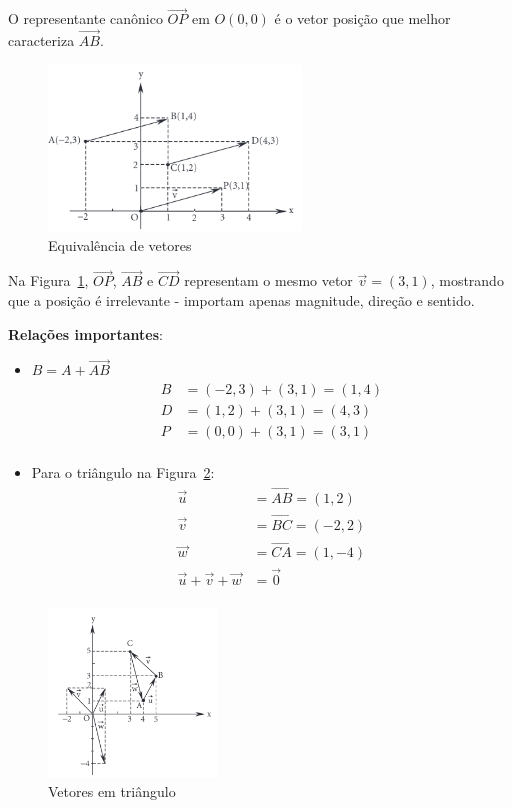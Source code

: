 O representante canônico $\overrightarrow{OP}$ em $O(0,0)$ é o vetor posição que
melhor caracteriza $\overrightarrow{AB}$.

\begin{figure}[h]
  \centering
  \includegraphics[width=0.6\textwidth]{./fig/fig1.46.png}
  \caption{Equivalência de vetores}\label{fig:fig1.46}
\end{figure}

Na Figura~\ref{fig:fig1.46}, $\overrightarrow{OP}$, $\overrightarrow{AB}$ e
$\overrightarrow{CD}$ representam o mesmo vetor $\vec{v}=(3,1)$, mostrando que a
posição é irrelevante - importam apenas magnitude, direção e sentido.

\newpage
\textbf{Relações importantes}:
\begin{itemize}
  \item $B = A + \overrightarrow{AB}$
    \begin{align*}
      B &= (-2,3) + (3,1) = (1,4) \\
      D &= (1,2) + (3,1) = (4,3) \\
      P &= (0,0) + (3,1) = (3,1) \\
    \end{align*}

  \item Para o triângulo na Figura~\ref{fig:fig1.47}:
    \begin{align*}
      \vec{u} &= \overrightarrow{AB} = (1,2) \\
      \vec{v} &= \overrightarrow{BC} = (-2,2) \\
      \vec{w} &= \overrightarrow{CA} = (1,-4) \\
      \vec{u}+\vec{v}+\vec{w} &= \vec{0} \\
    \end{align*}
\end{itemize}

\begin{figure}[h]
  \centering
  \includegraphics[width=0.4\textwidth]{./fig/fig1.47.png}
  \caption{Vetores em triângulo}\label{fig:fig1.47}
\end{figure}
